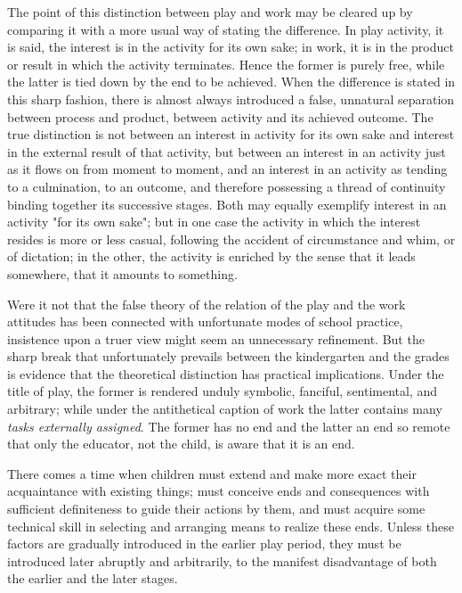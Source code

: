 \documentclass[showtrims,ustradepaper]{memoir}
\begin{document}
The point of this distinction between play and work may be cleared up by
comparing it with a more usual way of stating the difference. In play
activity, it is said, the interest is in the activity for its own sake;
in work, it is in the product or result in which the activity
terminates. Hence the former is purely free, while the latter is tied
down by the end to be achieved. When the difference is stated in this
sharp fashion, there is almost always introduced a false, unnatural
separation between process and product, between activity and its
achieved outcome. The true distinction is not between an interest in
activity for its own sake and interest in the external result of that
activity, but between an interest in an activity just as it flows on
from moment to moment, and an interest in an activity as tending to a
culmination, to an outcome, and therefore possessing a thread of
continuity binding together its successive stages. Both may equally
exemplify interest in an activity "for its own sake"; but in one case
the activity in which the interest resides is more or less casual,
following the accident of circumstance and whim, or of dictation; in the
other, the activity is enriched by the sense that it leads somewhere,
that it amounts to something.


Were it not that the false theory of the relation of the play and the
work attitudes has been connected with unfortunate modes of school
practice, insistence upon a truer view might seem an unnecessary
refinement. But the sharp break that unfortunately prevails between the
kindergarten and the grades is evidence that the theoretical distinction
has practical implications. Under the title of play, the former is
rendered unduly symbolic, fanciful, sentimental, and arbitrary; while
under the antithetical caption of work the latter
contains
many \emph{tasks externally assigned}. The former has no end and the
latter an end so remote that only the educator, not the child, is aware
that it is an end.

There comes a time when children must extend and make more exact their
acquaintance with existing things; must conceive ends and consequences
with sufficient definiteness to guide their actions by them, and must
acquire some technical skill in selecting and arranging means to realize
these ends. Unless these factors are gradually introduced in the earlier
play period, they must be introduced later abruptly and arbitrarily, to
the manifest disadvantage of both the earlier and the later stages.
\end{document}
